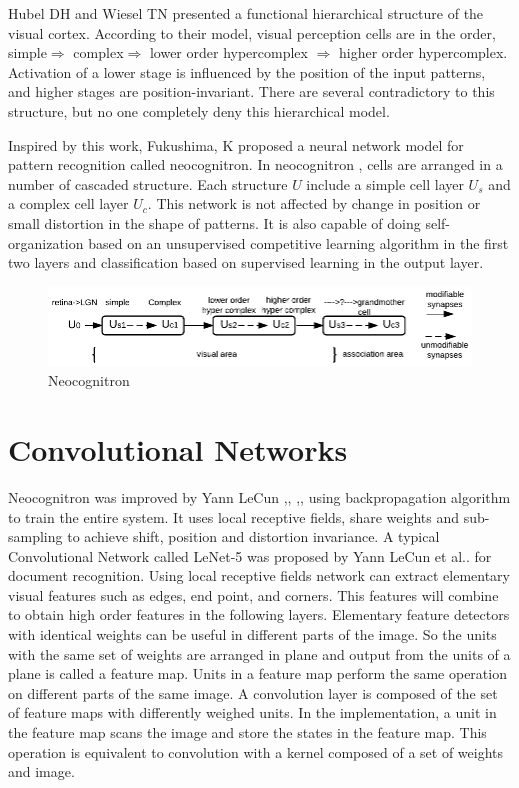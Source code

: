 \documentclass{article}
\begin{document}
\par Hubel DH and Wiesel TN \cite{Hubel1965a} presented a functional hierarchical structure of the visual cortex. According to their model, visual perception cells are in the  order, simple$\Longrightarrow$ complex$\Longrightarrow$ lower order hypercomplex $\Longrightarrow$ higher  order hypercomplex. Activation of  a lower stage is  influenced by  the position of the input patterns, and  higher stages are  position-invariant. There are several  contradictory to this structure, but no one   completely deny this hierarchical model.
\par Inspired by this work, Fukushima, K \cite{Stark1980} proposed a neural network model for pattern recognition called neocognitron.
In neocognitron , cells are arranged in  a number of  cascaded structure. Each  structure $U$ include a  simple cell layer $U_s$ and a complex cell layer $U_c$. This network is not affected by change in position or small distortion in the shape of patterns.  It is also capable of doing self-organization based on an unsupervised competitive learning algorithm\cite{Fukushima1982} in the first two layers and classification based on  supervised learning in the output layer.
\begin{figure}[ht]
 \includegraphics[]{Figures/neocognitron.eps}
\caption{Neocognitron\cite{Stark1980}}
\label{neo}
\end{figure}
\section{Convolutional Networks}
\par Neocognitron was improved by  Yann LeCun \cite{lecun-86},\cite{lecun-89d}, \cite{lecun-89e},\cite{lecun-90c}, \cite{lecun-90e} using backpropagation algorithm\cite{BRYSON1963} to train the entire system.
It uses  local receptive fields, share weights and  sub-sampling to achieve  shift, position and distortion invariance. A typical Convolutional Network called  LeNet-5 was proposed by   Yann LeCun et al..\cite{LeCun1998}  for document recognition. Using local receptive fields network can extract elementary visual features such as edges, end point, and corners. This features will combine to obtain high order features in the following layers.  Elementary feature detectors with identical weights can be useful in different parts of the image. So the units with  the same set of weights are arranged in plane and output from  the units of a plane is called  a feature map. Units in  a feature map perform the same operation on different parts of the same image. A convolution layer is composed of the set of feature maps with differently weighed units. In the implementation, a unit in the feature map scans the image and store the states in the feature map. This operation is equivalent to convolution with a kernel composed of a  set of weights and image. 
\end{document}
